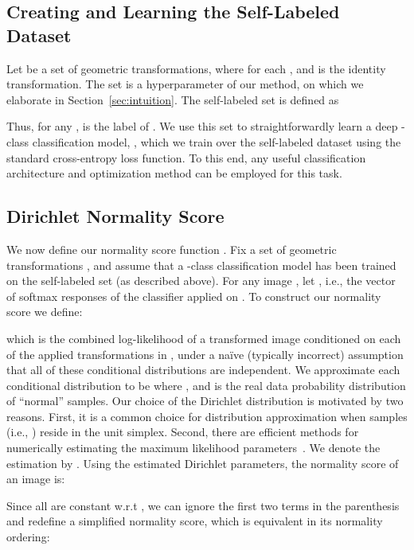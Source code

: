 \documentclass{article}
\begin{document}
	\subsection{Creating and Learning the Self-Labeled Dataset}
	\label{sec:selfLabeled}
	Let  be a set of geometric transformations, where for each , and
	 is the identity transformation. The set  is a hyperparameter of our method, on which we elaborate in Section~\ref{sec:intuition}. The self-labeled set  is defined as 
	 
	Thus, for any ,  is the label of .
	We use this set to straightforwardly learn a deep -class classification model, ,
	which we train over the self-labeled dataset  using
	the standard cross-entropy loss function.
	To this end, any useful classification architecture and optimization method can be employed for this task.
	


	\subsection{Dirichlet Normality Score} 
	\label{sec:normality_score}

    We now define our normality score function .	
    Fix a set of geometric transformations , 
    and assume that a -class classification model  has been trained on the self-labeled set 
    (as described above).
    For any image , let 
    , i.e.,
    the vector of softmax responses
	of the classifier  applied on .
    To construct our normality score we define: 
    
    which is the combined log-likelihood of a transformed image conditioned on each of the applied transformations in , under a na\"ive (typically incorrect) assumption that all of these conditional distributions are independent. 
    We approximate each conditional distribution to be 
	where , and  is the real data probability distribution of ``normal'' samples. Our choice of the Dirichlet distribution is motivated by two  reasons. 
	First, it is a common choice for distribution approximation when samples (i.e., ) reside in the unit  simplex. Second, there are efficient methods for numerically estimating the maximum likelihood parameters~\cite{minka2000estimating, wicker2008maximum}. 
We denote the estimation by . Using the estimated Dirichlet parameters, the normality score of an image  is:
	
Since all  are constant w.r.t , we can ignore the first two terms in the parenthesis and redefine a simplified normality score, which is equivalent in its normality ordering:
    
\end{document}

